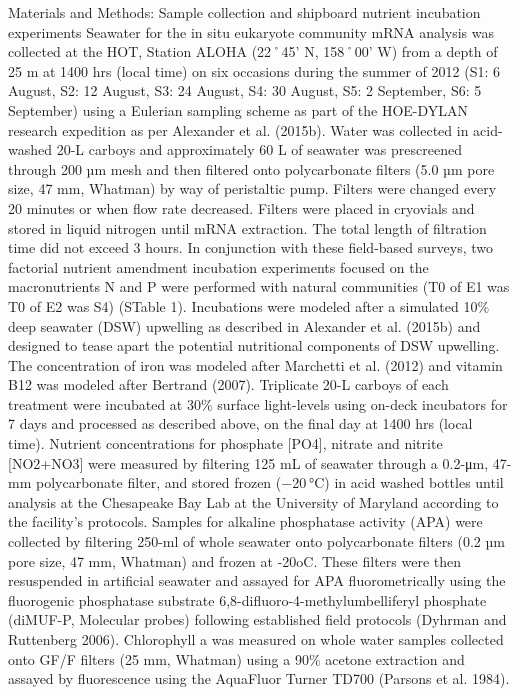 Materials and Methods:
Sample collection and shipboard nutrient incubation experiments
Seawater for the in situ eukaryote community mRNA analysis was collected at the HOT, Station ALOHA (22˚45’ N, 158˚00’ W) from a depth of 25 m at 1400 hrs (local time) on six occasions during the summer of 2012 (S1: 6 August, S2: 12 August, S3: 24 August, S4: 30 August, S5: 2 September, S6: 5 September) using a Eulerian sampling scheme as part of the HOE-DYLAN research expedition as per Alexander et al. (2015b). Water was collected in acid-washed 20-L carboys and approximately 60 L of seawater was prescreened through 200 µm mesh and then filtered onto polycarbonate filters (5.0 µm pore size, 47 mm, Whatman) by way of peristaltic pump. Filters were changed every 20 minutes or when flow rate decreased. Filters were placed in cryovials and stored in liquid nitrogen until mRNA extraction. The total length of filtration time did not exceed 3 hours. 
In conjunction with these field-based surveys, two factorial nutrient amendment incubation experiments focused on the macronutrients N and P were performed with natural communities (T0 of E1 was T0 of E2 was S4) (STable 1). Incubations were modeled after a simulated 10\% deep seawater (DSW) upwelling as described in Alexander et al. (2015b) and designed to tease apart the potential nutritional components of DSW upwelling. The concentration of iron was modeled after Marchetti et al. (2012) and vitamin B12 was modeled after Bertrand (2007). Triplicate 20-L carboys of each treatment were incubated at 30\% surface light-levels using on-deck incubators for 7 days and processed as described above, on the final day at 1400 hrs (local time). Nutrient concentrations for phosphate [PO4], nitrate and nitrite [NO2+NO3] were measured by filtering 125 mL of seawater through a 0.2-μm, 47-mm polycarbonate filter, and stored frozen (−20 °C) in acid washed bottles until analysis at the Chesapeake Bay Lab at the University of Maryland according to the facility's protocols. Samples for alkaline phosphatase activity (APA) were collected by filtering 250-ml of whole seawater onto polycarbonate filters (0.2 µm pore size, 47 mm, Whatman) and frozen at -20oC. These filters were then resuspended in artificial seawater and assayed for APA fluorometrically using the fluorogenic phosphatase substrate 6,8-difluoro-4-methylumbelliferyl phosphate (diMUF-P, Molecular probes) following established field protocols (Dyhrman and Ruttenberg 2006). Chlorophyll a was measured on whole water samples collected onto GF/F filters (25 mm, Whatman) using a 90\% acetone extraction and assayed by fluorescence using the AquaFluor Turner TD700 (Parsons et al. 1984).
